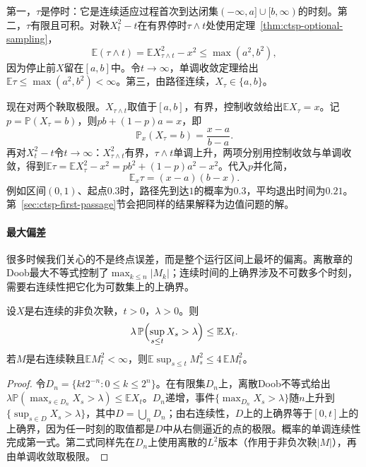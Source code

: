 第一，$\tau$是停时：它是连续适应过程首次到达闭集$(-\infty,a]\cup[b,\infty)$的时刻。第二，$\tau$有限且可积。对鞅$X_t^2-t$在有界停时$\tau\wedge t$处使用定理~\ref{thm:ctsp-optional-sampling}，
\[
  \mathbb E(\tau\wedge t)=\mathbb EX_{\tau\wedge t}^2-x^2\leq\max(a^2,b^2),
\]
因为停止前$X$留在$[a,b]$中。令$t\to\infty$，单调收敛定理给出$\mathbb E\tau\leq\max(a^2,b^2)<\infty$。第三，由路径连续，$X_\tau\in\{a,b\}$。

现在对两个鞅取极限。$X_{\tau\wedge t}$取值于$[a,b]$，有界，控制收敛给出$\mathbb EX_\tau=x$。记$p=\mathbb P(X_\tau=b)$，则$pb+(1-p)a=x$，即
\begin{equation}
  \mathbb P_x(X_\tau=b)=\frac{x-a}{b-a}.
  \label{eq:ctsp-exit-probability}
\end{equation}
再对$X_t^2-t$令$t\to\infty$：$X^2_{\tau\wedge t}$有界，$\tau\wedge t$单调上升，两项分别用控制收敛与单调收敛，得到$\mathbb E\tau=\mathbb EX_\tau^2-x^2=pb^2+(1-p)a^2-x^2$。代入$p$并化简，
\begin{equation}
  \mathbb E_x\tau=(x-a)(b-x).
  \label{eq:ctsp-exit-time}
\end{equation}
例如区间$(0,1)$、起点$0.3$时，路径先到达$1$的概率为$0.3$，平均退出时间为$0.21$。第~\ref{sec:ctsp-first-passage}节会把同样的结果解释为边值问题的解。

\paragraph{最大偏差}
很多时候我们关心的不是终点误差，而是整个运行区间上最坏的偏离。离散章的Doob最大不等式控制了$\max_{k\leq n}|M_k|$；连续时间的上确界涉及不可数多个时刻，需要右连续性把它化为可数集上的上确界。

\begin{theorem}[Doob最大不等式]
  \label{thm:ctsp-doob-maximal}
  设$X$是右连续的非负次鞅，$t>0$，$\lambda>0$。则
  \[
    \lambda\,\mathbb P\Bigl(\sup_{s\leq t}X_s>\lambda\Bigr)\leq\mathbb EX_t .
  \]
  若$M$是右连续鞅且$\mathbb EM_t^2<\infty$，则$\mathbb E\sup_{s\leq t}M_s^2\leq4\,\mathbb EM_t^2$。
\end{theorem}

\begin{proof}
令$D_n=\{kt2^{-n}:0\leq k\leq2^n\}$。在有限集$D_n$上，离散Doob不等式给出$\lambda\mathbb P(\max_{s\in D_n}X_s>\lambda)\leq\mathbb EX_t$。$D_n$递增，事件$\{\max_{D_n}X_s>\lambda\}$随$n$上升到$\{\sup_{s\in D}X_s>\lambda\}$，其中$D=\bigcup_nD_n$；由右连续性，$D$上的上确界等于$[0,t]$上的上确界，因为任一时刻的取值都是$D$中从右侧逼近的点的极限。概率的单调连续性完成第一式。第二式同样先在$D_n$上使用离散的$L^2$版本（作用于非负次鞅$|M|$），再由单调收敛取极限。
\end{proof}

